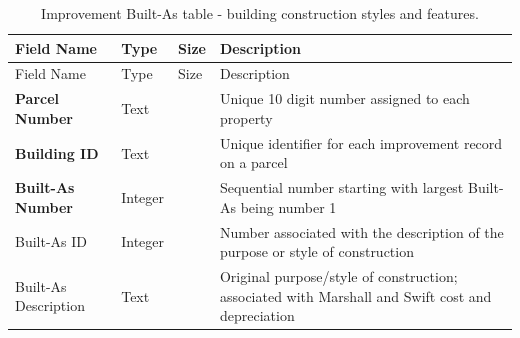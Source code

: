 \documentclass[
  english,
  letterpaper,
  DIV=11,
  numbers=noendperiod]{scrreprt}
\begin{document}
\begin{longtable}[]{@{}
  >{\raggedright\arraybackslash}p{}
  >{\raggedright\arraybackslash}p{}
  >{\raggedright\arraybackslash}p{}
  >{\raggedright\arraybackslash}p{}@{}}
\caption{Improvement Built-As table - building construction styles and
features.}\label{tbl-app-builtas}\tabularnewline
\toprule\noalign{}
\begin{minipage}[b]{\linewidth}\raggedright
Field Name
\end{minipage} & \begin{minipage}[b]{\linewidth}\raggedright
Type
\end{minipage} & \begin{minipage}[b]{\linewidth}\raggedright
Size
\end{minipage} & \begin{minipage}[b]{\linewidth}\raggedright
Description
\end{minipage} \\
\midrule\noalign{}
\endfirsthead
\toprule\noalign{}
\begin{minipage}[b]{\linewidth}\raggedright
Field Name
\end{minipage} & \begin{minipage}[b]{\linewidth}\raggedright
Type
\end{minipage} & \begin{minipage}[b]{\linewidth}\raggedright
Size
\end{minipage} & \begin{minipage}[b]{\linewidth}\raggedright
Description
\end{minipage} \\
\midrule\noalign{}
\endhead
\bottomrule\noalign{}
\endlastfoot
\textbf{Parcel Number} & Text & 10 & Unique 10 digit number assigned to
each property \\
\textbf{Building ID} & Text & 5 & Unique identifier for each improvement
record on a parcel \\
\textbf{Built-As Number} & Integer & & Sequential number starting with
largest Built-As being number 1 \\
Built-As ID & Integer & & Number associated with the description of the
purpose or style of construction \\
Built-As Description & Text & 255 & Original purpose/style of
construction; associated with Marshall and Swift cost and depreciation

\end{longtable}
\end{document}
